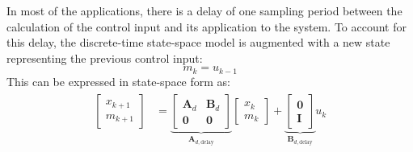 In most of the applications, there is a delay of one sampling period between the calculation of the control input and its application to the system. To account for this delay, the discrete-time state-space model is augmented with a new state representing the previous control input:
\begin{equation}
    m_k = u_{k - 1}
\end{equation}
This can be expressed in state-space form as:
\begin{align}
    \begin{aligned}
        \begin{bmatrix}
            x_{k + 1}\\
            m_{k + 1}
        \end{bmatrix}
        &=
        \underbrace{
        \begin{bmatrix}
            \mathbf{A}_d & \mathbf{B}_d \\
            \mathbf{0} & \mathbf{0}
        \end{bmatrix}
        }_{\mathbf{A}_{d,\text{delay}}}
        \begin{bmatrix}
            x_k\\
            m_k
        \end{bmatrix}
        +
        \underbrace{
        \begin{bmatrix}
            \mathbf{0}\\
            \mathbf{I}
        \end{bmatrix}
        }_{\mathbf{B}_{d,\text{delay}}}
        u_k
    \end{aligned}
\end{align}
